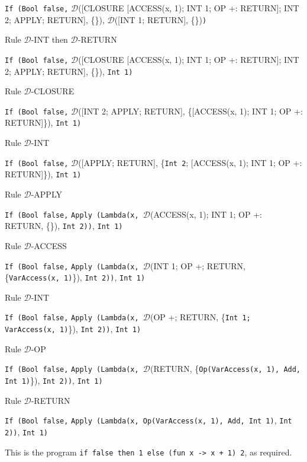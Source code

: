 \documentclass[11pt]{article}
\begin{document}
\begin{landscape}
{\noindent \texttt{If (Bool false,} $\mathcal{D}$([CLOSURE [ACCESS(x, 1); INT 1; OP +: RETURN]; INT 2; APPLY; RETURN], \{\}), $\mathcal{D}$([INT 1; RETURN], \{\})\texttt{)}

\smallskip
\noindent Rule $\mathcal{D}$-INT then $\mathcal{D}$-RETURN
\smallskip


\noindent \texttt{If (Bool false,} $\mathcal{D}$([CLOSURE [ACCESS(x, 1); INT 1; OP +: RETURN]; INT 2; APPLY; RETURN], \{\}), \texttt{Int 1}\texttt{)}

\smallskip
\noindent Rule $\mathcal{D}$-CLOSURE
\smallskip


\noindent \texttt{If (Bool false,} $\mathcal{D}$([INT 2; APPLY; RETURN], \{[ACCESS(x, 1); INT 1; OP +: RETURN]\}), \texttt{Int 1}\texttt{)}

\smallskip
\noindent Rule $\mathcal{D}$-INT
\smallskip

\noindent \texttt{If (Bool false,} $\mathcal{D}$([APPLY; RETURN], \{\texttt{Int 2}; [ACCESS(x, 1); INT 1; OP +: RETURN]\}), \texttt{Int 1}\texttt{)}

\smallskip
\noindent Rule $\mathcal{D}$-APPLY
\smallskip

\noindent \texttt{If (Bool false,} \texttt{Apply (Lambda(x, }$\mathcal{D}$(ACCESS(x, 1); INT 1; OP +: RETURN, \{\}), \texttt{Int 2))}, \texttt{Int 1}\texttt{)}

\smallskip
\noindent Rule $\mathcal{D}$-ACCESS
\smallskip

\noindent \texttt{If (Bool false,} \texttt{Apply (Lambda(x, }$\mathcal{D}$(INT 1; OP +; RETURN, \{\texttt{VarAccess(x, 1)}\}), \texttt{Int 2))}, \texttt{Int 1}\texttt{)}

\smallskip
\noindent Rule $\mathcal{D}$-INT
\smallskip

\noindent \texttt{If (Bool false,} \texttt{Apply (Lambda(x, }$\mathcal{D}$(OP +; RETURN, \{\texttt{Int 1; VarAccess(x, 1)}\}), \texttt{Int 2))}, \texttt{Int 1}\texttt{)}

\smallskip
\noindent Rule $\mathcal{D}$-OP
\smallskip

\noindent \texttt{If (Bool false,} \texttt{Apply (Lambda(x, }$\mathcal{D}$(RETURN, \{\texttt{Op(VarAccess(x, 1), Add, Int 1)}\}), \texttt{Int 2))}, \texttt{Int 1}\texttt{)}

\smallskip
\noindent Rule $\mathcal{D}$-RETURN
\smallskip

\noindent \texttt{If (Bool false,} \texttt{Apply (Lambda(x, Op(VarAccess(x, 1), Add, Int 1)}, \texttt{Int 2))}, \texttt{Int 1}\texttt{)}

\bigskip

\noindent This is the program \texttt{if false then 1 else (fun x -> x + 1) 2}, as required.

}\end{landscape}
\end{document}
